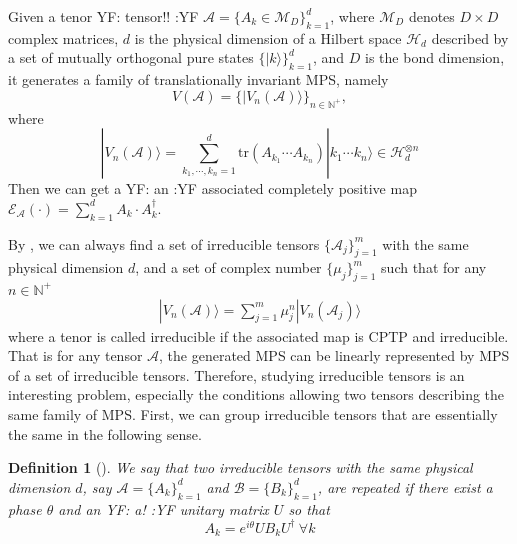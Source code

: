 \documentclass[journal]{IEEEtran}
\def\h{\ensuremath{\mathcal{H}}}
\def\a{\ensuremath{\mathcal{A}}}
\def\b{\ensuremath{\mathcal{B}}}
\def\e{\ensuremath{\mathcal{E}}}
\newtheorem{definition}{Definition}
\newcommand{\authorComment}[3]{\color{#1}#2: {#3} :#2\color{black}}
\newcommand{\yf}[1]{\authorComment{blue}{YF}{#1}}
\begin{document}
Given a  tenor \yf{tensor!!} $\a=\{A_{k}\in \mathcal{M}_D\}_{k=1}^{d}$, where $\mathcal{M}_{D}$ denotes $D\times D$ complex matrices, $d$ is the physical dimension of a Hilbert space $\h_d$ described by a set of mutually orthogonal pure states $\{|k\rangle\}_{k=1}^{d}$, and $D$ is the bond dimension, it generates a family of translationally invariant MPS, namely
$$V(\a)=\{|V_{n}(\a)\rangle\}_{n\in \mathbb{N^+}},$$
where $$|V_{n}(\a)\rangle=\sum_{k_1,\cdots,k_n=1}^{d}\textrm{tr}(A_{k_1}\cdots A_{k_n})|k_1\cdots k_{n}\rangle\in\h_d^{\otimes n}$$
Then we can get a \yf{an} associated completely positive map $\e_\a(\cdot)=\sum_{k=1}^{d}A_{k}\cdot A_{k}^\dagger$.

By \cite{cuevas2017irreducible}, we can always find a set of irreducible tensors $\{\a_{j}\}_{j=1}^{m}$ with the same physical dimension $d$, and a set of complex number $\{\mu_{j}\}_{j=1}^{m}$ such that for any $n\in\mathbb{N^{+}}$
\begin{eqnarray}\label{Eq_MPS}
  |V_n(\a)\rangle=\sum_{j=1}^{m}\mu_j^{n}|V_n(\a_{j})\rangle
\end{eqnarray}
where a tenor is called irreducible if the associated map is CPTP and irreducible. That is for any tensor $\a$,  the generated MPS can be linearly represented by MPS of a set of irreducible tensors. Therefore, studying irreducible tensors is an interesting problem, especially the conditions allowing two tensors describing the same family of
MPS.
First, we can group irreducible tensors that are essentially the same in the following sense.
\begin{definition}[\cite{cuevas2017irreducible}]
  We say that two irreducible tensors with the same physical dimension $d$, say $\a=\{A_{k}\}_{k=1}^{d}$ and $\b=\{B_{k}\}_{k=1}^{d}$, are repeated if there exist a phase $\theta$ and an \yf{a!} unitary matrix $U$ so that 
  $$A_{k}=e^{i\theta}UB_kU^\dagger \ \forall k$$
\end{definition}
\end{document}
